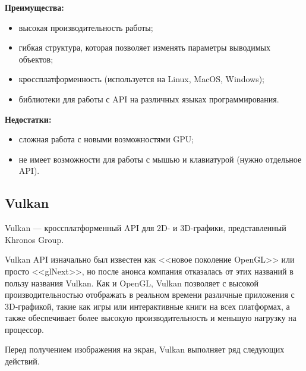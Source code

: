 \textbf{Преимущества:} 
\begin{itemize}
    \item высокая производительность работы;
    \item гибкая структура, которая позволяет изменять параметры выводимых объектов;
    \item кроссплатформенность (используется на Linux, MacOS, Windows);
    \item библиотеки для работы с API на различных языках программирования.
\end{itemize}

\textbf{Недостатки:} 
\begin{itemize}
    \item сложная работа с новыми возможностями GPU;
    \item не имеет возможности для работы с мышью и клавиатурой (нужно отдельное API).
\end{itemize}


\subsection{Vulkan}

Vulkan — кроссплатформенный API для 2D- и 3D-графики, представленный Khronos Group.

Vulkan API изначально был известен как <<новое поколение OpenGL>> или просто <<glNext>>, но после анонса компания отказалась от этих названий в пользу названия Vulkan. Как и OpenGL, Vulkan позволяет с высокой производительностью отображать в реальном времени различные приложения с 3D-графикой, такие как игры или интерактивные книги на всех платформах, а также обеспечивает более высокую производительность и меньшую нагрузку на процессор.

Перед получением изображения на экран, Vulkan выполняет ряд следующих действий.

